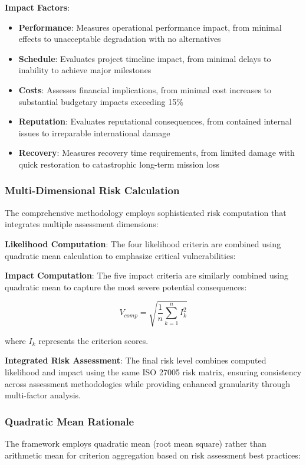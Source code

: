 \documentclass[binding=0.6cm]{sapthesis}
\begin{document}
\textbf{Impact Factors}:
\begin{itemize}
    \item \textbf{Performance}: Measures operational performance impact, from minimal effects to unacceptable degradation with no alternatives
    \item \textbf{Schedule}: Evaluates project timeline impact, from minimal delays to inability to achieve major milestones
    \item \textbf{Costs}: Assesses financial implications, from minimal cost increases to substantial budgetary impacts exceeding 15\%
    \item \textbf{Reputation}: Evaluates reputational consequences, from contained internal issues to irreparable international damage
    \item \textbf{Recovery}: Measures recovery time requirements, from limited damage with quick restoration to catastrophic long-term mission loss
\end{itemize}

\subsubsection{Multi-Dimensional Risk Calculation}

The comprehensive methodology employs sophisticated risk computation that integrates multiple assessment dimensions:

\textbf{Likelihood Computation}: The four likelihood criteria are combined using quadratic mean calculation to emphasize critical vulnerabilities:

\textbf{Impact Computation}: The five impact criteria are similarly combined using quadratic mean to capture the most severe potential consequences:

$$V_{comp} = \sqrt{\frac{1}{n}\sum_{k=1}^{n} I_k^2}$$

where $I_k$ represents the criterion scores.

\textbf{Integrated Risk Assessment}: The final risk level combines computed likelihood and impact using the same ISO 27005 risk matrix, ensuring consistency across assessment methodologies while providing enhanced granularity through multi-factor analysis.

\subsubsection{Quadratic Mean Rationale}

The framework employs quadratic mean (root mean square) rather than arithmetic mean for criterion aggregation based on risk assessment best practices:
\end{document}
